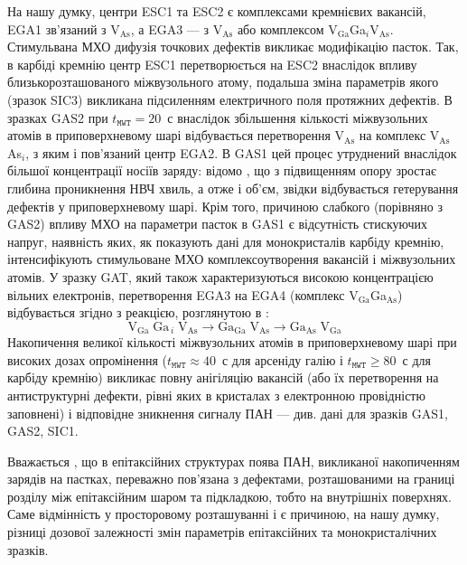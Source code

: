\documentclass[a4paper,14pt,oneside,openany]{memoir}
\begin{document}
На нашу думку, центри ESC1 та ESC2 є комплексами кремнієвих вакансій, EGA1 зв'язаний з V$_\text{As}$, а EGA3 --- з V$_\text{As}$ або комплексом V$_\text{Ga}$Ga$_i$V$_\text{As}$.
Стимульвана МХО дифузія точкових дефектів викликає модифікацію пасток.
Так, в карбіді кремнію центр ESC1 перетворюється на ESC2 внаслідок впливу близькорозташованого міжвузольного атому, подальша зміна параметрів якого (зразок SIC3) викликана підсиленням електричного поля протяжних дефектів.
В зразках GAS2 при $t_\mathtt{MWT}=20$~с внаслідок збільшення кількості міжвузольних атомів в приповерхневому шарі
відбувається перетворення V$_\text{As}$ на комплекс V$_\text{As}$As$_i$, з яким і пов'язаний центр EGA2.
В GAS1 цей процес утруднений внаслідок більшої концентрації носіїв заряду:
відомо \cite{ZOHM2000}, що з підвищенням опору зростає глибина проникнення НВЧ хвиль, а отже і об'єм, звідки відбувається гетерування дефектів у приповерхневому шарі.
Крім того, причиною слабкого (порівняно з GAS2) впливу МХО на параметри пасток в GAS1 є відсутність стискуючих напруг,
наявність яких, як показують дані для монокристалів карбіду кремнію, інтенсифікують стимульоване МХО комплексоутворення вакансій і міжвузольних атомів.
У зразку GAT, який також характеризуються високою концентрацією вільних електронів,
перетворення EGA3 на EGA4 (комплекс V$_\text{Ga}$Ga$_\text{As}$) відбувається згідно з реакцією, розглянутою в \cite{FANG1990}:
\begin{equation*}
  \text{V}_\text{Ga}\;\text{Ga}_{\,i}\;\text{V}_\text{As}\rightarrow \text{Ga}_\text{Ga}\;\text{V}_\text{As}
  \rightarrow \text{Ga}_\text{As}\;\text{V}_\text{Ga}
\end{equation*}
Накопичення великої кількості міжвузольних атомів в приповерхневому шарі при високих дозах опромінення ($t_\mathtt{MWT}\approx40$~с для арсеніду галію і $t_\mathtt{MWT}\geq80$~с для карбіду кремнію) викликає повну анігіляцію вакансій (або їх перетворення на антиструктурні дефекти, рівні яких в кристалах з електронною провідністю заповнені) і відповідне зникнення сигналу ПАН --- див. дані для зразків GAS1, GAS2, SIC1.


Вважається \cite{Saiko1993,OlikhSSC,OstrovPAN}, що в епітаксійних структурах поява ПАН, викликаної накопиченням зарядів на пастках, переважно пов'язана з дефектами, розташованими на границі розділу між епітаксійним шаром та підкладкою,
тобто на внутрішніх поверхнях.
Саме відмінність у просторовому розташуванні і є причиною, на нашу думку, різниці дозової залежності змін параметрів епітаксійних та монокристалічних зразків.
\end{document}
